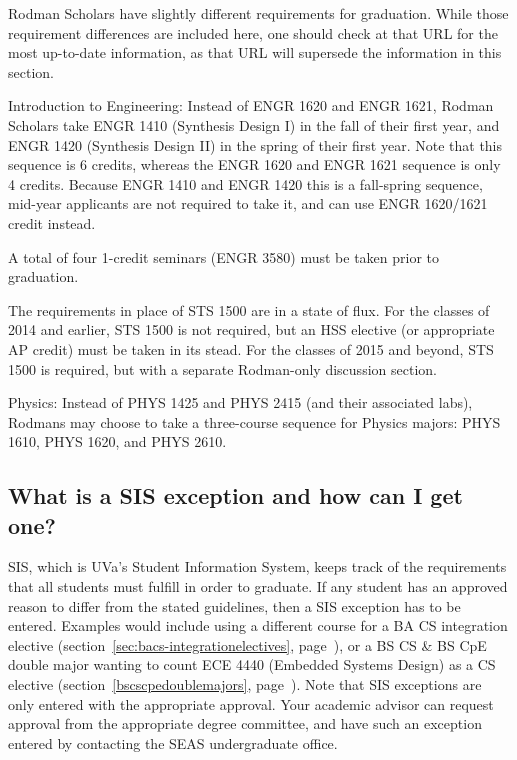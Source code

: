 Rodman Scholars have
slightly different
requirements
for graduation.  While those requirement differences are included
here, one should check at that URL for the
most up-to-date information, as that URL will supersede the
information in this section.

\begin{itemlist}
\item Introduction to Engineering: Instead of ENGR 1620 and ENGR 1621,
  Rodman Scholars take ENGR 1410 (Synthesis Design I) in the fall of
  their first year, and ENGR 1420 (Synthesis Design II) in the spring
  of their first year.  Note that this sequence is 6 credits, whereas
  the ENGR 1620 and ENGR 1621 sequence is only 4 credits.  Because
  ENGR 1410 and ENGR 1420 this is a fall-spring sequence, mid-year
  applicants are not required to take it, and can use ENGR 1620/1621
  credit instead.
\item A total of four 1-credit seminars (ENGR 3580) must be taken
  prior to graduation.
\item The requirements in place of STS 1500 are in a state of flux.
  For the classes of 2014 and earlier, STS 1500 is not required, but
  an HSS elective (or appropriate AP credit) must be taken in its
  stead.  For the classes of 2015 and beyond, STS 1500 is required,
  but with a separate Rodman-only discussion section.
\item Physics: Instead of PHYS 1425 and PHYS 2415 (and their
  associated labs), Rodmans may choose
  to take a three-course sequence for Physics majors: PHYS 1610, PHYS
  1620, and PHYS 2610.
\end{itemlist}

\subsection{What is a SIS exception and how can I get one?}
\label{sec:sisexceptions}

SIS, which is UVa's Student Information System, keeps track of the
requirements that all students must fulfill in order to graduate.  If
any student has an approved reason to differ from the stated
guidelines, then a SIS exception has to be entered.  Examples would
include using a different course for a BA CS integration elective
(section~\ref{sec:bacs-integrationelectives},
page~\pageref{sec:bacs-integrationelectives}), or a BS CS \& BS CpE
double major wanting to count ECE 4440 (Embedded Systems Design) as a CS
elective (section~\ref{bscscpedoublemajors},
page~\pageref{bscscpedoublemajors}).  Note that SIS exceptions are only
entered with the appropriate approval.  Your academic advisor can
request approval from the appropriate degree committee, and have such
an exception entered by contacting the SEAS undergraduate office.

